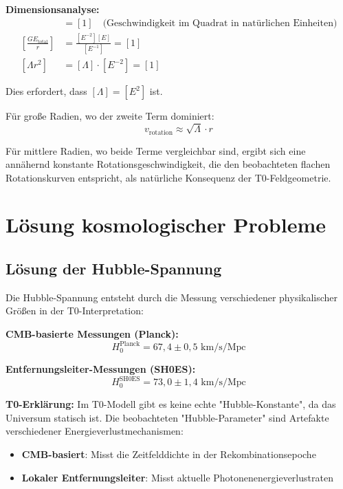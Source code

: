 \documentclass[12pt,a4paper]{report}
\begin{document}
\textbf{Dimensionsanalyse:}
\begin{align}
	[v_{\text{rotation}}^2] &= [1] \quad \text{(Geschwindigkeit im Quadrat in natürlichen Einheiten)} \\
	\left[\frac{GE_{\text{total}}}{r}\right] &= \frac{[E^{-2}][E]}{[E^{-1}]} = [1] \\
	[\Lambda r^2] &= [\Lambda] \cdot [E^{-2}] = [1]
\end{align}

Dies erfordert, dass $[\Lambda] = [E^2]$ ist.

Für große Radien, wo der zweite Term dominiert:
\begin{equation}
	v_{\text{rotation}} \approx \sqrt{\Lambda} \cdot r
\end{equation}

Für mittlere Radien, wo beide Terme vergleichbar sind, ergibt sich eine annähernd konstante Rotationsgeschwindigkeit, die den beobachteten flachen Rotationskurven entspricht, als natürliche Konsequenz der T0-Feldgeometrie.
	\section{Lösung kosmologischer Probleme}
	\label{sec:cosmological_problems}
	
	\subsection{Lösung der Hubble-Spannung}
	\label{subsec:hubble_tension_resolution}
	
	Die Hubble-Spannung entsteht durch die Messung verschiedener physikalischer Größen in der T0-Interpretation:
	
	\textbf{CMB-basierte Messungen (Planck):}
	\begin{equation}
		H_0^{\text{Planck}} = 67,4 \pm 0,5 \text{ km/s/Mpc}
	\end{equation}
	
	\textbf{Entfernungsleiter-Messungen (SH0ES):}
	\begin{equation}
		H_0^{\text{SH0ES}} = 73,0 \pm 1,4 \text{ km/s/Mpc}
	\end{equation}
	
	\textbf{T0-Erklärung:}
	Im T0-Modell gibt es keine echte "Hubble-Konstante", da das Universum statisch ist. Die beobachteten "Hubble-Parameter" sind Artefakte verschiedener Energieverlustmechanismen:
	
	\begin{itemize}
		\item \textbf{CMB-basiert}: Misst die Zeitfelddichte in der Rekombinationsepoche
		\item \textbf{Lokaler Entfernungsleiter}: Misst aktuelle Photonenenergieverlustraten
	\end{itemize}
	
\end{document}
